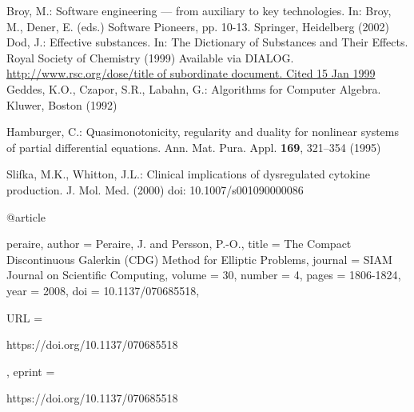 \begin{thebibliography}{99.}%
%
%

 Broy, M.: Software engineering --- from auxiliary to key technologies. In: Broy, M., Dener, E. (eds.) Software Pioneers, pp. 10-13. Springer, Heidelberg (2002)
%
 Dod, J.: Effective substances. In: The Dictionary of Substances and Their Effects. Royal Society of Chemistry (1999) Available via DIALOG. \\
\url{http://www.rsc.org/dose/title of subordinate document. Cited 15 Jan 1999}
%
 Geddes, K.O., Czapor, S.R., Labahn, G.: Algorithms for Computer Algebra. Kluwer, Boston (1992) 
%

 Hamburger, C.: Quasimonotonicity, regularity and duality for nonlinear systems of partial differential equations. Ann. Mat. Pura. Appl. \textbf{169}, 321--354 (1995)
%

 Slifka, M.K., Whitton, J.L.: Clinical implications of dysregulated cytokine production. J. Mol. Med. (2000) doi: 10.1007/s001090000086 

@article{peraire,
author = {Peraire, J. and Persson, P.-O.},
title = {The Compact Discontinuous Galerkin (CDG) Method for Elliptic Problems},
journal = {SIAM Journal on Scientific Computing},
volume = {30},
number = {4},
pages = {1806-1824},
year = {2008},
doi = {10.1137/070685518},

URL = { 
        https://doi.org/10.1137/070685518
    
},
eprint = { 
        https://doi.org/10.1137/070685518
    
}

}

%
\bigskip


\end{thebibliography}
